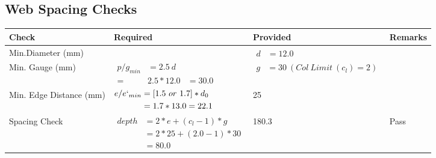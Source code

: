 \documentclass{article}%
\begin{document}
%
\newpage%
\subsection{Web Spacing Checks}%
\label{subsec:WebSpacingChecks}%
\renewcommand{\arraystretch}{1.2}%
\begin{longtable}{|p{2.5cm}|p{7.5cm}|p{5cm}|p{1cm}|}%
\hline%
\rowcolor{OsdagGreen}%
Check&Required&Provided&Remarks\\%
\hline%
\endhead%
\hline%
Min.Diameter (mm)&&$\begin{aligned} d &=12.0\end{aligned}$&\\%
\hline%
Min. Gauge (mm)&$\begin{aligned}p/g_{min}&= 2.5 ~ d&\\ =&2.5*12.0&=30.0\end{aligned}$&$\begin{aligned} g &=30~(Col~Limit~(c_l) = 2)\end{aligned}$&\\%
\hline%
Min. Edge Distance (mm)&$\begin{aligned}e/e`_{min} &=[1.5~or~ 1.7] * d_0\\ &=1.7*13.0=22.1 \end{aligned}$&25&\\%
\hline%
Spacing Check&$\begin{aligned} depth & = 2 * e + (c_l -1) * g\\ & = 2 * 25+(2.0-1)*30\\ & = 80.0\end{aligned}$&180.3&Pass\\%
\hline%
\end{longtable}

%
\newpage%
\end{document}
